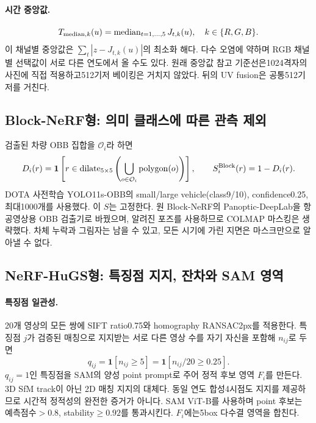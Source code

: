 \documentclass[11pt,a4paper]{article}
\newcommand{\ind}{\mathbf{1}}
\newcommand{\med}{\operatorname{median}}
\newcommand{\dilate}{\operatorname{dilate}}
\begin{document}
\paragraph{시간 중앙값.}
\begin{equation}
 T_{{\rm median},k}(u)=\med_{t=1,\ldots,5}J_{t,k}(u),\quad k\in\{R,G,B\}.
\end{equation}
이 채널별 중앙값은 $\sum_t|z-J_{t,k}(u)|$의 최소화 해다. 다수 오염에 약하며 RGB 채널별 선택값이 서로 다른 연도에서 올 수도 있다. 원래 중앙값 참고 기준선은1024격자의 사진에 직접 적용하고512기저 베이킹은 거치지 않았다. 뒤의 UV fusion은 공통512기저를 거친다.

\subsection{Block-NeRF형: 의미 클래스에 따른 관측 제외}
검출된 차량 OBB 집합을 $\mathcal O_i$라 하면
\begin{equation}
 D_i(r)=\ind\left[r\in\dilate_{5\times5}\left(\bigcup_{o\in\mathcal O_i}\operatorname{polygon}(o)\right)\right],
 \qquad S_i^{\rm Block}(r)=1-D_i(r).
\end{equation}
DOTA 사전학습 YOLO11s-OBB의 small/large vehicle(class9/10), confidence0.25, 최대1000개를 사용했다. 이 $S$는 고정한다. 원 Block-NeRF의 Panoptic-DeepLab을 항공영상용 OBB 검출기로 바꿨으며, 알려진 포즈를 사용하므로 COLMAP 마스킹은 생략했다. 차체 누락과 그림자는 남을 수 있고, 모든 시기에 가린 지면은 마스크만으로 알아낼 수 없다.

\subsection{NeRF-HuGS형: 특징점 지지, 잔차와 SAM 영역}
\paragraph{특징점 일관성.}
20개 영상의 모든 쌍에 SIFT ratio0.75와 homography RANSAC2px를 적용한다. 특징점 $j$가 검증된 매칭으로 지지받는 서로 다른 영상 수를 자기 자신을 포함해 $n_{ij}$로 두면
\begin{equation}
 q_{ij}=\ind[n_{ij}\ge5]=\ind[n_{ij}/20\ge0.25].
\end{equation}
$q_{ij}=1$인 특징점을 SAM의 양성 point prompt로 주어 정적 후보 영역 $F_i$를 만든다. 3D SfM track이 아닌 2D 매칭 지지의 대체다. 동일 연도 합성4시점도 지지를 제공하므로 시간적 정적성의 완전한 증거가 아니다. SAM ViT-B를 사용하며 point 후보는 예측점수$>0.8$, stability$\ge0.92$를 통과시킨다. $F_i$에는5box 다수결 영역을 합친다.
\end{document}
